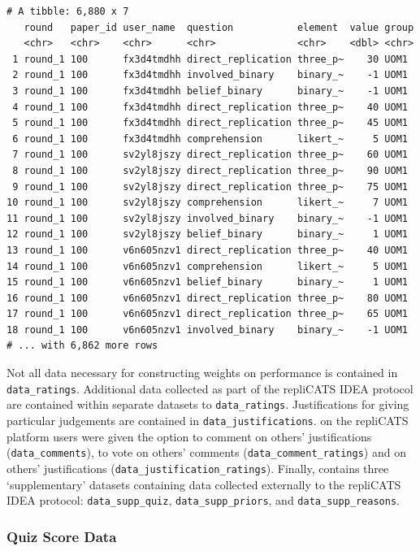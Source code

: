 \documentclass[article]{jss}
\begin{document}
\begin{verbatim}
# A tibble: 6,880 x 7
   round   paper_id user_name  question           element  value group
   <chr>   <chr>    <chr>      <chr>              <chr>    <dbl> <chr>
 1 round_1 100      fx3d4tmdhh direct_replication three_p~    30 UOM1 
 2 round_1 100      fx3d4tmdhh involved_binary    binary_~    -1 UOM1 
 3 round_1 100      fx3d4tmdhh belief_binary      binary_~    -1 UOM1 
 4 round_1 100      fx3d4tmdhh direct_replication three_p~    40 UOM1 
 5 round_1 100      fx3d4tmdhh direct_replication three_p~    45 UOM1 
 6 round_1 100      fx3d4tmdhh comprehension      likert_~     5 UOM1 
 7 round_1 100      sv2yl8jszy direct_replication three_p~    60 UOM1 
 8 round_1 100      sv2yl8jszy direct_replication three_p~    90 UOM1 
 9 round_1 100      sv2yl8jszy direct_replication three_p~    75 UOM1 
10 round_1 100      sv2yl8jszy comprehension      likert_~     7 UOM1 
11 round_1 100      sv2yl8jszy involved_binary    binary_~    -1 UOM1 
12 round_1 100      sv2yl8jszy belief_binary      binary_~     1 UOM1 
13 round_1 100      v6n605nzv1 direct_replication three_p~    40 UOM1 
14 round_1 100      v6n605nzv1 comprehension      likert_~     5 UOM1 
15 round_1 100      v6n605nzv1 belief_binary      binary_~     1 UOM1 
16 round_1 100      v6n605nzv1 direct_replication three_p~    80 UOM1 
17 round_1 100      v6n605nzv1 direct_replication three_p~    65 UOM1 
18 round_1 100      v6n605nzv1 involved_binary    binary_~    -1 UOM1 
# ... with 6,862 more rows
\end{verbatim}

Not all data necessary for constructing weights on performance is
contained in \texttt{data\_ratings}. Additional data collected as part
of the repliCATS IDEA protocol are contained within separate datasets to
\texttt{data\_ratings}. Justifications for giving particular judgements
are contained in \texttt{data\_justifications}. on the repliCATS
platform users were given the option to comment on others'
justifications (\texttt{data\_comments}), to vote on others' comments
(\texttt{data\_comment\_ratings}) and on others' justifications
(\texttt{data\_justification\_ratings}). Finally, 
contains three `supplementary' datasets containing data collected
externally to the repliCATS IDEA protocol: \texttt{data\_supp\_quiz},
\texttt{data\_supp\_priors}, and \texttt{data\_supp\_reasons}.

\hypertarget{sec-quiz-supplementary-data}{%
\subsubsection{Quiz Score Data}\label{sec-quiz-supplementary-data}}
\end{document}
